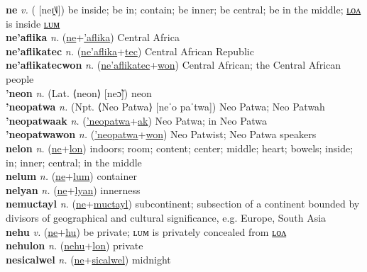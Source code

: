 \textbf{ne} \textit{v.} ( [neɪ̯˥˩])
be inside; be in; contain; be inner; be central; be in the middle; \hyperref[nelon]{ʟᴏᴧ} is inside \hyperref[nelum]{ʟᴜᴍ} \label{ne} \\
\textbf{ne'aflika} \textit{n.} (\hyperref[ne]{ne}+\hyperref['aflika]{'aflika})
Central Africa \label{ne'aflika} \\
\textbf{ne'aflikatec} \textit{n.} (\hyperref[ne'aflika]{ne'aflika}+\hyperref[tec]{tec})
Central African Republic \label{ne'aflikatec} \\
\textbf{ne'aflikatecwon} \textit{n.} (\hyperref[ne'aflikatec]{ne'aflikatec}+\hyperref[won]{won})
Central African; the Central African people \label{ne'aflikatecwon} \\
\textbf{'neon} \textit{n.} (Lat. ⟨neon⟩ [neɔ̃])
neon \label{'neon} \\
\textbf{'neopatwa} \textit{n.} (Npt. ⟨Neo Patwa⟩ [neˈo paˈtwa])
Neo Patwa; Neo Patwah \label{'neopatwa} \\
\textbf{'neopatwaak} \textit{n.} (\hyperref['neopatwa]{'neopatwa}+\hyperref[ak]{ak})
Neo Patwa; in Neo Patwa \label{'neopatwaak} \\
\textbf{'neopatwawon} \textit{n.} (\hyperref['neopatwa]{'neopatwa}+\hyperref[won]{won})
Neo Patwist; Neo Patwa speakers \label{'neopatwawon} \\
\textbf{nelon} \textit{n.} (\hyperref[ne]{ne}+\hyperref[lon]{lon})
indoors; room; content; center; middle; heart; bowels; inside; in; inner; central; in the middle \label{nelon} \\
\textbf{nelum} \textit{n.} (\hyperref[ne]{ne}+\hyperref[lum]{lum})
container \label{nelum} \\
\textbf{nelyan} \textit{n.} (\hyperref[ne]{ne}+\hyperref[lyan]{lyan})
innerness \label{nelyan} \\
\textbf{nemuctayl} \textit{n.} (\hyperref[ne]{ne}+\hyperref[muctayl]{muctayl})
subcontinent; subsection of a continent bounded by divisors of geographical and cultural significance, e.g. Europe, South Asia \label{nemuctayl} \\
\textbf{nehu} \textit{v.} (\hyperref[ne]{ne}+\hyperref[hu]{hu})
be private; ʟᴜᴍ is privately concealed from \hyperref[nehulon]{ʟᴏᴧ} \label{nehu} \\
\textbf{nehulon} \textit{n.} (\hyperref[nehu]{nehu}+\hyperref[lon]{lon})
private \label{nehulon} \\
\textbf{nesicalwel} \textit{n.} (\hyperref[ne]{ne}+\hyperref[sicalwel]{sicalwel})
midnight \label{nesicalwel} \\
